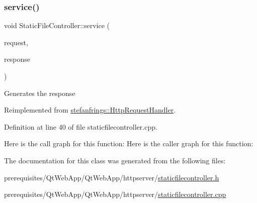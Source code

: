 \subsubsection{\texorpdfstring{service()}{service()}}
{\footnotesize\ttfamily void Static\+File\+Controller\+::service (\begin{DoxyParamCaption}\item[{\mbox{\hyperlink{classstefanfrings_1_1_http_request}{Http\+Request}} \&}]{request,  }\item[{\mbox{\hyperlink{classstefanfrings_1_1_http_response}{Http\+Response}} \&}]{response }\end{DoxyParamCaption})\hspace{0.3cm}{\ttfamily [virtual]}}

Generates the response 

Reimplemented from \mbox{\hyperlink{classstefanfrings_1_1_http_request_handler_a0a7210907152c46b8b5a47feb64cf6bd}{stefanfrings\+::\+Http\+Request\+Handler}}.



Definition at line 40 of file staticfilecontroller.\+cpp.

Here is the call graph for this function\+:
Here is the caller graph for this function\+:


The documentation for this class was generated from the following files\+:\begin{DoxyCompactItemize}
\item 
prerequisites/\+Qt\+Web\+App/\+Qt\+Web\+App/httpserver/\mbox{\hyperlink{staticfilecontroller_8h}{staticfilecontroller.\+h}}\item 
prerequisites/\+Qt\+Web\+App/\+Qt\+Web\+App/httpserver/\mbox{\hyperlink{staticfilecontroller_8cpp}{staticfilecontroller.\+cpp}}\end{DoxyCompactItemize}
